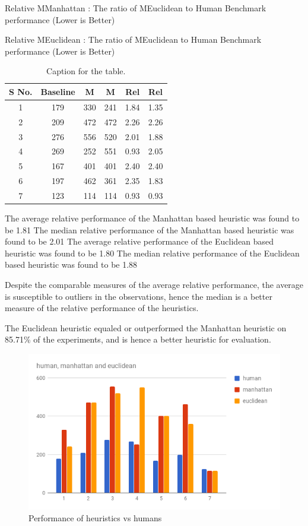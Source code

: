 Relative MManhattan : The ratio of MEuclidean to Human Benchmark performance (Lower is Better)
 
Relative MEuclidean : The ratio of MEuclidean to Human Benchmark performance (Lower is Better)

\begin{table}[h!]
  \centering
  \caption{Caption for the table.}
  \label{tab:table1}
  \begin{tabular}{cccccc}
    \toprule
      S No. & Baseline & M & M  & Rel & Rel\\
    \midrule
    	1 & 179 & 330 & 241 & 1.84 & 1.35\\
    	2 & 209 & 472 & 472 & 2.26 & 2.26\\
    	3 & 276 & 556 & 520 & 2.01 & 1.88\\
    	4 & 269 & 252 & 551 & 0.93 & 2.05\\
    	5 & 167 & 401 & 401 & 2.40 & 2.40\\
    	6 & 197 & 462 & 361 & 2.35 & 1.83\\
    	7 & 123 & 114 & 114 & 0.93 & 0.93\\
    \bottomrule
  \end{tabular}
\end{table}


The average relative performance of the Manhattan based heuristic was found to be 1.81
The median relative performance of the Manhattan based heuristic was found to be 2.01
The average relative performance of the Euclidean based heuristic was found to be 1.80
The median relative performance of the Euclidean based heuristic was found to be 1.88
 
Despite the comparable measures of the average relative performance, the average is susceptible to outliers in the observations, hence the median is a better measure of the relative performance of the heuristics.
  
The Euclidean heuristic equaled or outperformed the Manhattan heuristic on 85.71\% of the experiments, and is hence a better heuristic for evaluation.


\begin{figure}
  \includegraphics[width=\linewidth]{images/chart.png}
  \caption{Performance of heuristics vs humans}
  \label{fig:chart1}
\end{figure}